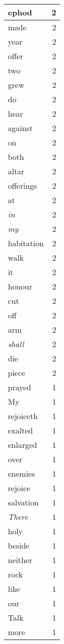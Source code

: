 \begin{center}
\begin{longtable}{l|r}
ephod & 2 \\ \hline
made & 2 \\ \hline
year & 2 \\ \hline
offer & 2 \\ \hline
two & 2 \\ \hline
grew & 2 \\ \hline
do & 2 \\ \hline
hear & 2 \\ \hline
against & 2 \\ \hline
on & 2 \\ \hline
both & 2 \\ \hline
altar & 2 \\ \hline
offerings & 2 \\ \hline
at & 2 \\ \hline
\emph{in} & 2 \\ \hline
\emph{my} & 2 \\ \hline
habitation & 2 \\ \hline
walk & 2 \\ \hline
it & 2 \\ \hline
honour & 2 \\ \hline
cut & 2 \\ \hline
off & 2 \\ \hline
arm & 2 \\ \hline
\emph{shall} & 2 \\ \hline
die & 2 \\ \hline
piece & 2 \\ \hline
prayed & 1 \\ \hline
My & 1 \\ \hline
rejoiceth & 1 \\ \hline
exalted & 1 \\ \hline
enlarged & 1 \\ \hline
over & 1 \\ \hline
enemies & 1 \\ \hline
rejoice & 1 \\ \hline
salvation & 1 \\ \hline
\emph{There} & 1 \\ \hline
holy & 1 \\ \hline
beside & 1 \\ \hline
neither & 1 \\ \hline
rock & 1 \\ \hline
like & 1 \\ \hline
our & 1 \\ \hline
Talk & 1 \\ \hline
more & 1 \\ \hline

\end{longtable}
\end{center}
